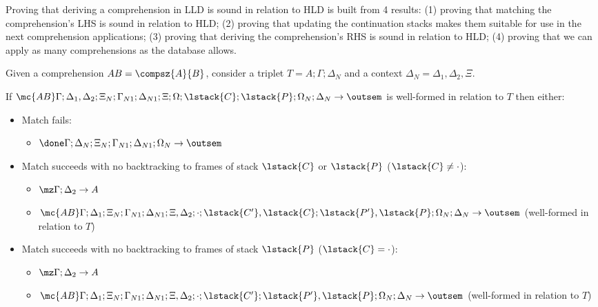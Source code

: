 
Proving that deriving a comprehension in LLD is sound in relation to HLD is
built from 4 results: (1) proving that matching the comprehension's LHS is sound
in relation to HLD; (2) proving that updating the continuation stacks makes them
suitable for use in the next comprehension applications; (3) proving that
deriving the comprehension's RHS is sound in relation to HLD; (4) proving that
we can apply as many comprehensions as the database allows.

\begin{lemma}\label{thm:comprehension_body_match}
Given a comprehension $AB = \compsz{A}{B}$, consider a triplet $T = A; \Gamma;
\Delta_{N}$ and a context $\Delta_{N} = \Delta_1, \Delta_2, \Xi$.

If $\mc{AB} \Gamma; \Delta_1, \Delta_2; \Xi_N; \Gamma_{N1}; \Delta_{N1}; \Xi;
\Omega; \lstack{C}; \lstack{P}; \Omega_N; \Delta_N \rightarrow \outsem$ is
well-formed in relation to $T$ then either:

\begin{itemize}[leftmargin=*]
   \item Match fails:
   \begin{itemize}[leftmargin=\secondm]
      \item $\done \Gamma; \Delta_N; \Xi_N; \Gamma_{N1}; \Delta_{N1}; \Omega_N \rightarrow \outsem$
   \end{itemize}
   
   \item Match succeeds with no backtracking to frames of stack $\lstack{C}$ or
   $\lstack{P}$ ($\lstack{C} \neq \cdot$):

   \begin{itemize}[leftmargin=\secondm]
      \item $\mz \Gamma; \Delta_2 \rightarrow A$
      \item $\mc{AB} \Gamma; \Delta_1; \Xi_N; \Gamma_{N1}; \Delta_{N1}; \Xi,
         \Delta_2; \cdot; \lstack{C'}, \lstack{C}; \lstack{P'}, \lstack{P}; \Omega_N; \Delta_N
         \rightarrow \outsem$ (well-formed in relation to $T$)
   \end{itemize}

   \item Match succeeds with no backtracking to frames of stack $\lstack{P}$ ($\lstack{C} =
         \cdot$):
   \begin{itemize}[leftmargin=\secondm]
      \item $\mz \Gamma; \Delta_2 \rightarrow A$
      \item $\mc{AB} \Gamma; \Delta_1; \Xi_N; \Gamma_{N1}; \Delta_{N1}; \Xi,
         \Delta_2; \cdot; \lstack{C'}; \lstack{P'}, \lstack{P}; \Omega_N; \Delta_N
         \rightarrow \outsem$ (well-formed in relation to $T$)
   \end{itemize}


\end{itemize}
\end{lemma}
